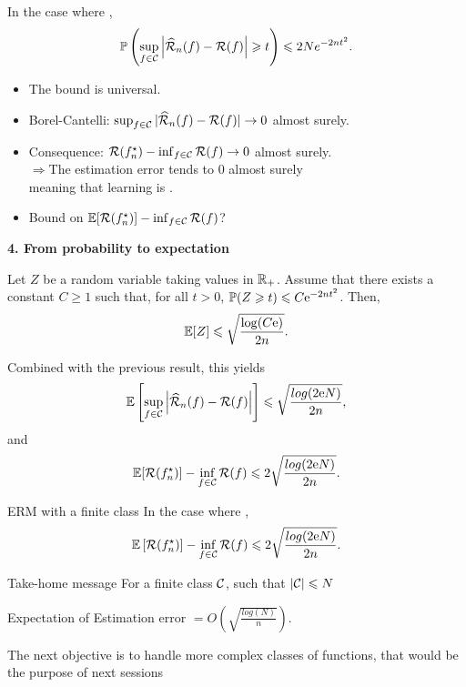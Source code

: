 \documentclass[xcolor={usenames,dvipsnames},handout]{beamer}
\begin{document}
\begin{frame}
In the case where ,
$$
\P \left( \sup_{f\in \Cc} \left| \widehat{\Rc}_n(f) - \Rc(f)  \right| \geq t  \right) \leq 2N e^{-2nt^2}.
$$
\begin{itemize}
\item The bound is universal.
\item Borel-Cantelli: $\sup_{f\in \Cc} |\widehat{\Rc}_n(f) - \Rc(f) | \to 0$ almost surely. 
\item Consequence: $\Rc(f_n^\star) - \inf_{f\in \Cc} \Rc(f)  \to 0$  almost surely. \\
$ \Rightarrow$The estimation error tends to 0 almost surely\\
 meaning that learning is .
\item Bound on $\E [\Rc (f_n^\star)] - \inf_{f\in \Cc} \Rc(f)$?
\end{itemize}
\end{frame}

\begin{frame}

\textbf{4. From probability to expectation} \hfill \\
\begin{lemma}[$\P$ to $\E$]
\label{lem:PtoE}
Let $Z$ be a random variable taking values in $\R_+$. Assume that there exists a constant $C\geq 1$ such that, for all $t>0$, $\P (Z\geq t) \leq  C \mathrm{e}^{-2nt^2}$.
Then,
$$
\E [Z]\leq  \sqrt{\frac{\log(C\mathrm{e})}{2n}}.
$$
\end{lemma}

Combined with the previous result, this yields
$$
 \E \left[  \sup_{f\in \Cc} \left| \widehat{\Rc}_n(f) - \Rc(f)  \right| \right] \leq \sqrt{\frac{log(2\mathrm{e}N)}{2n}},
$$
and
$$
\E [\Rc( f_n^\star)] - \inf_{f\in\Cc} \Rc (f) \leq 2 \sqrt{\frac{log(2\mathrm{e}N)}{2n}}.
$$
\end{frame}

\begin{frame}{ERM with a finite class}
In the case where ,
$$
\E \left[\Rc( f_n^\star)\right] - \inf_{f\in\Cc} \Rc (f) \leq 2 \sqrt{\frac{log(2\mathrm{e}N)}{2n}}.
$$
\begin{alertblock}{Take-home message}
For a finite class $\Cc$, such that $|\Cc|\leq N$
\begin{center}
Expectation of Estimation error $= O \left(\sqrt{\frac{log(N)}{n}} \right)   $.
\end{center}
\end{alertblock}

The next objective is to handle more complex classes of functions, that would be the purpose of next sessions

\vspace{.2cm}


\end{frame}
\end{document}
